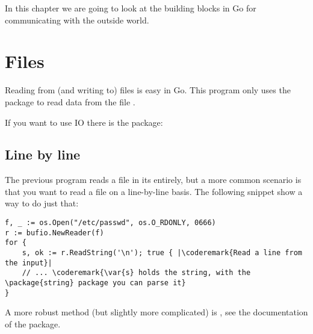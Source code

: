 \noindent{}In this chapter we are going to look at the building blocks in Go for 
communicating with the outside world.

\section{Files}
Reading from (and writing to) files is easy in Go. This program
only uses the  package to read data from the file .

\showremarks

If you want to use  IO there is the
 package:

\showremarks

\subsection{Line by line}
The previous program reads a file in its entirely, but a more common scenario is that
you want to read a file on a line-by-line basis. The following snippet show a way
to do just that:

\begin{lstlisting}
f, _ := os.Open("/etc/passwd", os.O_RDONLY, 0666)
r := bufio.NewReader(f)
for {
    s, ok := r.ReadString('\n'); true { |\coderemark{Read a line from the input}|
    // ... \coderemark{\var{s} holds the string, with the \package{string} package you can parse it}
}
\end{lstlisting}

A more robust method (but slightly more complicated) is , see the documentation
of the  package.

